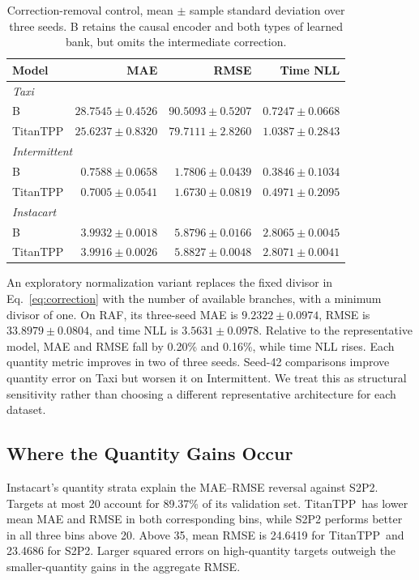 \documentclass[runningheads]{llncs}
\newcommand{\method}{TitanTPP}
\begin{document}
\begin{table}[t]
\caption{Correction-removal control, mean $\pm$ sample standard deviation
over three seeds. B retains the causal encoder and both types of learned
bank, but omits the intermediate correction.}
\label{tab:ablation}\centering\small
\begin{tabular}{lrrr}
\toprule
Model & MAE & RMSE & Time NLL\\
\midrule
\multicolumn{4}{l}{\textit{Taxi}}\\
B & $28.7545\pm0.4526$ & $90.5093\pm0.5207$ & $0.7247\pm0.0668$\\
TitanTPP & $25.6237\pm0.8320$ & $79.7111\pm2.8260$ & $1.0387\pm0.2843$\\
\midrule
\multicolumn{4}{l}{\textit{Intermittent}}\\
B & $0.7588\pm0.0658$ & $1.7806\pm0.0439$ & $0.3846\pm0.1034$\\
TitanTPP & $0.7005\pm0.0541$ & $1.6730\pm0.0819$ & $0.4971\pm0.2095$\\
\midrule
\multicolumn{4}{l}{\textit{Instacart}}\\
B & $3.9932\pm0.0018$ & $5.8796\pm0.0166$ & $2.8065\pm0.0045$\\
TitanTPP & $3.9916\pm0.0026$ & $5.8827\pm0.0048$ & $2.8071\pm0.0041$\\
\bottomrule
\end{tabular}
\end{table}

An exploratory normalization variant replaces the fixed divisor in
Eq.~\eqref{eq:correction} with the number of available branches, with a
minimum divisor of one. On RAF, its three-seed MAE is $9.2322\pm0.0974$,
RMSE is $33.8979\pm0.0804$, and time NLL is $3.5631\pm0.0978$.
Relative to the representative model, MAE and RMSE fall by 0.20\% and
0.16\%, while time NLL rises. Each quantity metric improves in two of three
seeds. Seed-42 comparisons improve quantity error on Taxi but worsen it on
Intermittent. We treat this as structural sensitivity rather than choosing a
different representative architecture for each dataset.

\subsection{Where the Quantity Gains Occur}
Instacart's quantity strata explain the MAE--RMSE reversal against S2P2.
Targets at most 20 account for 89.37\% of its validation set. \method\ has
lower mean MAE and RMSE in both corresponding bins, while S2P2 performs
better in all three bins above 20. Above 35, mean RMSE is 24.6419 for
\method\ and 23.4686 for S2P2. Larger squared errors on high-quantity
targets outweigh the smaller-quantity gains in the aggregate RMSE.
\end{document}
